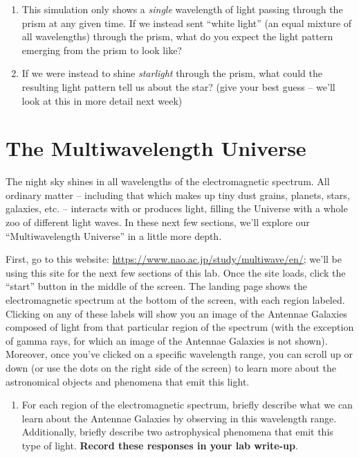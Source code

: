 \documentclass[11pt]{article}
\begin{document}
\begin{enumerate}
\begin{enumerate}
        \item This simulation only shows a \emph{single} wavelength of light passing through the prism at any given time. If we instead sent ``white light'' (an equal mixture of all wavelengths) through the prism, what do you expect the light pattern emerging from the prism to look like? 
        
        \item If we were instead to shine \emph{starlight} through the prism, what could the resulting light pattern tell us about the star? (give your best guess -- we'll look at this in more detail next week)
        
    \end{enumerate}
\end{enumerate}

\section{The Multiwavelength Universe}
The night sky shines in all wavelengths of the electromagnetic spectrum. All ordinary matter -- including that which makes up tiny dust grains, planets, stars, galaxies, etc. -- interacts with or produces light, filling the Universe with a whole zoo of different light waves. In these next few sections, we'll explore our ``Multiwavelength Universe'' in a little more depth.

\medskip \noindent
First, go to this website: \url{https://www.nao.ac.jp/study/multiwave/en/}; we'll be using this site for the next few sections of this lab. Once the site loads, click the ``start'' button in the middle of the screen. The landing page shows the electromagnetic spectrum at the bottom of the screen, with each region labeled. Clicking on any of these labels will show you an image of the Antennae Galaxies composed of light from that particular region of the spectrum (with the exception of gamma rays, for which an image of the Antennae Galaxies is not shown). Moreover, once you've clicked on a specific wavelength range, you can scroll up or down (or use the dots on the right side of the screen) to learn more about the astronomical objects and phenomena that emit this light.

\begin{enumerate}
    \item For each region of the electromagnetic spectrum, briefly describe what we can learn about the Antennae Galaxies by observing in this wavelength range. Additionally, briefly describe two astrophysical phenomena that emit this type of light. \textbf{Record these responses in your lab write-up}.
\end{enumerate}
\end{document}
